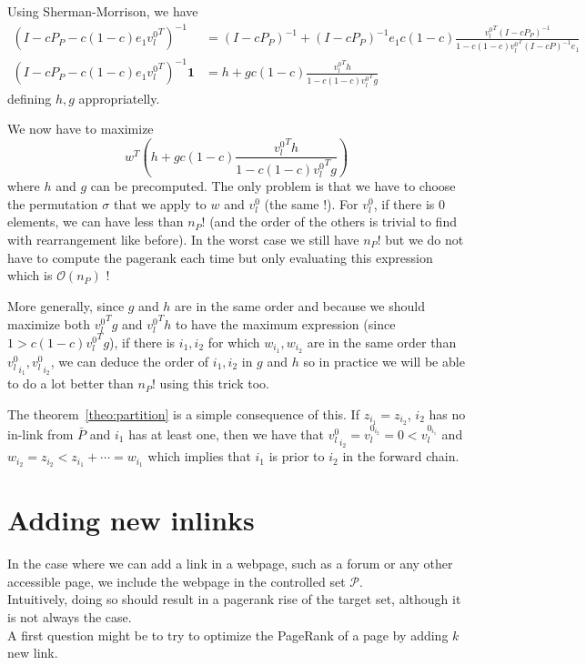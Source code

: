 \documentclass{article}
\newcommand{\bigoh}{\mathcal{O}}
\newcommand{\1}{\mathbf{1}}
\theoremstyle{definition}
\begin{document}
Using Sherman-Morrison, we have
\begin{align*}
  (I - cP_P - c (1-c) e_1 {v_l^0}^T)^{-1} & = (I - cP_P)^{-1} + (I - cP_P)^{-1}e_1 c(1-c) \frac{{v_l^0}^T(I-cP_P)^{-1}}{1 - c(1-c){v_l^0}^T(I-cP)^{-1}e_1}\\
  (I - cP_P - c (1-c) e_1 {v_l^0}^T)^{-1}\1 & = h + g c(1-c) \frac{{v_l^0}^Th}{1 - c(1-c){v_l^0}^Tg}
\end{align*}
defining $h,g$ appropriatelly.

We now have to maximize
\[ w^T \left(h + g c(1-c) \frac{{v_l^0}^Th}{1 - c(1-c){v_l^0}^Tg}\right) \]
where $h$ and $g$ can be precomputed.
The only problem is that we have to choose the permutation $\sigma$ that we apply to $w$ and $v_l^0$ (the same !).
For $v_l^0$, if there is 0 elements, we can have less than $n_P!$ (and the order of the others is trivial to find with rearrangement like before).
In the worst case we still have $n_P!$ but we do not have to compute the pagerank each time but only evaluating this expression which is $\bigoh(n_P)$ !

More generally, since $g$ and $h$ are in the same order  and because we should maximize both ${v_l^0}^Tg$ and ${v_l^0}^Th$ to have the maximum expression (since $1 > c(1-c){v_l^0}^Tg$),
if there is $i_1, i_2$ for which $w_{i_1}, w_{i_2}$ are in the same order than ${v_l^0}_{i_1}, {v_l^0}_{i_2}$,
we can deduce the order of $i_1, i_2$ in $g$ and $h$ so in practice we will be able to do a lot better than $n_P!$ using this trick too.


The theorem~\ref{theo:partition} is a simple consequence of this.
If $z_{i_1} = z_{i_2}$, $i_2$ has no in-link from $\bar{P}$ and $i_1$ has at least one,
then we have that
${v_l^0}_{i_2} = v_l^{0_{i_2}} = 0 < v_l^{0_{i_1}}$ and $w_{i_2} = z_{i_2} < z_{i_1} + \cdots = w_{i_1}$
which implies that $i_1$ is prior to $i_2$ in the forward chain.

\section{Adding new inlinks}
In the case where we can add a link in a webpage, such as a forum or any other accessible page, we include the webpage in the controlled set $\mathcal{P}$.\\
Intuitively, doing so should result in a pagerank rise of the target set, although it is not always the case.\\
A first question might be to try to optimize the PageRank of a page
by adding $k$ new link.
\end{document}
